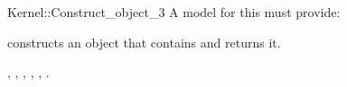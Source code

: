 \begin{ccRefFunctionObjectConcept}{Kernel::Construct_object_3}
A model for this must provide:


{constructs an object that contains  and returns it.}

\ccSeeAlso
{},
,
,
,
,
.

\end{ccRefFunctionObjectConcept}
